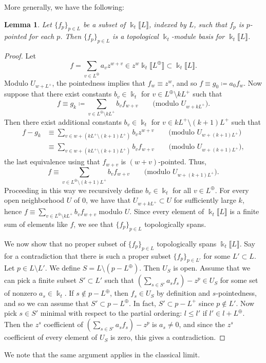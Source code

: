 \documentclass{amsart}
\let\llb=\llbracket
\let\rrb=\rrbracket
\newcommand {\kk} {\Bbbk}
\theoremstyle{plain}%
\newtheorem{lem}[thm]{Lemma}
\theoremstyle{definition}
\theoremstyle{remark}
\begin{document}
More generally, we have the following:
\begin{lem}\label{PointedBasis}
Let $\{f_p\}_{p\in L}$ be a subset of $\kk_t\llb L\rrb$, indexed by $L$, such that $f_p$ is $p$-pointed for each $p$.  Then $\{f_p\}_{p\in L}$ is a topological $\kk_t$-module basis for $\kk_t\llb L\rrb$.
\end{lem}
\begin{proof}
Let $$f=\sum_{v\in L^{\oplus}} a_vz^{w+v}\in z^w\kk_t\llb L^{\oplus}\rrb \subset \kk_t\llb L\rrb.$$
Modulo $U_{w+L^+}$, the pointedness implies that $f_w\equiv z^w$, and so $f\equiv g_0\coloneqq a_0f_w$.  Now suppose that there exist constants $b_v\in \kk_t$ for $v\in L^{\oplus}\setminus kL^+$ such that $$f\equiv g_k\coloneqq \sum_{v\in L^{\oplus}\setminus kL^+} b_vf_{w+v}\quad\quad \mbox{(modulo $U_{w+kL^+}$).}$$  Then there exist additional constants $b_v\in \kk_t$ for $v\in kL^+\setminus (k+1)L^+$ such that
\begin{align*}
    f-g_k&\equiv \sum_{v\in w+(kL^+\setminus(k+1)L^+)} b_vz^{w+v} \quad\quad \mbox{(modulo $U_{w+(k+1)L^+}$)}\\
    &\equiv \sum_{v\in w+(kL^+\setminus(k+1)L^+)} b_vf_{w+v} \quad\quad \mbox{(modulo $U_{w+(k+1)L^+}$)},
\end{align*} 
the last equivalence using that $f_{w+v}$ is $(w+v)$-pointed.  Thus, $$f\equiv \sum_{v\in L^{\oplus}\setminus (k+1)L^+} b_vf_{w+v}\quad\quad \mbox{(modulo $U_{w+(k+1)L^+}$)}.$$
Proceeding in this way we recursively define $b_v\in\kk_t$ for all $v\in L^{\oplus}$.  For every open neighborhood $U$ of $0$, we have that $U_{w+kL^+}\subset U$ for sufficiently large $k$, hence $f\equiv \sum_{v\in L^{\oplus}\setminus kL^+} b_vf_{w+v}$ modulo $U$.  Since every element of $\kk_t\llb L\rrb$ is a finite sum of elements like $f$, we see that $\{f_p\}_{p\in L}$ topologically spans.

We now show that no proper subset of $\{f_p\}_{p\in L}$ topologically spans $\kk_t\llb L\rrb$.  Say for a contradiction that there is such a proper subset $\{f_p\}_{p\in L'}$ for some $L'\subset L$.  Let $p\in L\setminus L'$.  We define $S=L\setminus (p-L^{\oplus})$.  Then $U_S$ is open.  Assume that we can pick a finite subset $S'\subset L'$ such that $(\sum_{s\in S'}a_sf_s)-z^p\in U_S$ for some set of nonzero $a_s\in\kk_t$.  If $s\notin p-L^{\oplus}$, then $f_s\in U_S$ by definition and $s$-pointedness, and so we can assume that $S'\subset p-L^{\oplus}$.  In fact, $S'\subset p-L^+$ since $p\notin L'$.  Now pick $s\in S'$ minimal with respect to the partial ordering: $l\leq l'$ if $l'\in l+L^{\oplus}$.  Then the $z^s$ coefficient of $(\sum_{s\in S'}a_sf_s)-z^p$ is $a_s\neq 0$, and since the $z^s$ coefficient of every element of $U_S$ is zero, this gives a contradiction. 
\end{proof}
We note that the same argument applies in the classical limit.
\end{document}
